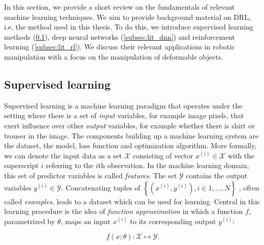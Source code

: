 \documentclass[\home/main.tex]{subfiles}
\begin{document}
In this section, we provide a short review on the fundamentals of relevant machine learning techniques. We aim to provide background material on \acrfull{DRL}, i.e. the method used in this thesis. To do this, we introduce supervised learning methods (\cref{subsec:lit_sl}), deep neural networks (\cref{subsec:lit_dnn}) and reinforcement learning (\cref{subsec:lit_rl}). We discuss their relevant applications in robotic manipulation with a focus on the manipulation of deformable objects. %

\subsection{Supervised learning} \label{subsec:lit_sl}

\newcommand*{\prob}{\mathrm{P}}

Supervised learning is a machine learning paradigm that operates under the setting where there is a set of \textit{input} variables, for example image pixels, that exert influence over other \textit{output} variables, for example whether there is shirt or trouser in the image.
The components building up a machine learning system are the dataset, the model, loss function and optimization algorithm. 
More formally, we can denote the input data as a set $\mathcal{X}$ consisting of vector $x^{(i)} \in \mathcal{X} $ with the superscript $i$ referring to the $i$th observation. In the machine learning domain, this set of predictor variables is called \textit{features}. The set $\mathcal{Y}$ contains the output variables $y^{(i)} \in \mathcal{Y}$. Concatenating tuples of 
$\left\{\left(x^{(i)}, y^{(i)}\right) , i \in 1,\dots,N \right\}$
, often called \textit{examples}, leads to a dataset which can be used for learning. Central in this learning procedure is the idea of \textit{function approximation} in which a function $f$, parametrized by $\theta$, maps an input $x^{(i)}$ to its corresponding output $y^{(i)}$:

\begin{equation*}
	f(x;\theta): \mathcal{X} \mapsto \mathcal{Y}.
\end{equation*}
\end{document}
